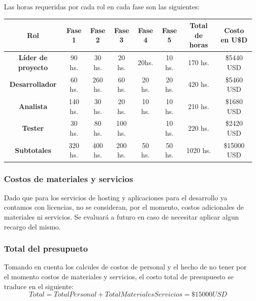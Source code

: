\documentclass[a4paper,12pt]{article}
\begin{document}
    \par Las horas requeridas por cada rol en cada fase son las siguientes: \newline
    \begin{center}
        \begin{adjustbox}{width=1\textwidth}
            \begin{tabular}{ |c|c|c|c|c|c|c|c| }
                \hline
                \rowcolor{lightgray} \textbf{Rol} & \textbf{Fase 1} & \textbf{Fase 2} & \textbf{Fase 3} & \textbf{Fase 4} & \textbf{Fase 5} & \textbf{Total de horas} & \textbf{Costo en U\$D} \\
                \hline    
                \cellcolor{lightgray} \textbf{Líder de proyecto} & 90 hs. & 30 hs. & 20 hs. & 20hs. & 10 hs. & \cellcolor{lightgray} 170 hs. & \cellcolor{lightgray} \$5440 USD \\
                \hline
                \cellcolor{lightgray} \textbf{Desarrollador} & 60 hs. & 260 hs. & 60 hs. & 20 hs. & 20 hs. & \cellcolor{lightgray} 420 hs. & \cellcolor{lightgray} \$5460 USD \\
                \hline
                \cellcolor{lightgray} \textbf{Analista} & 140 hs. & 30 hs. & 20 hs. & 10 hs. & 10 hs. & \cellcolor{lightgray} 210 hs. & \cellcolor{lightgray} \$1680 USD \\
                \hline
                \cellcolor{lightgray} \textbf{Tester} & 30 hs. & 80 hs. & 100 hs. &  & 10 hs. & \cellcolor{lightgray} 220 hs. & \cellcolor{lightgray} \$2420 USD \\
                \hline
                \rowcolor{lightgray} \textbf{Subtotales} & 320 hs. & 400 hs. & 200 hs. & 50 hs. & 50 hs. & 1020 hs. & \$15000 USD \\
                \hline
            \end{tabular}
        \end{adjustbox}
    \end{center}
    \subsubsection{Costos de materiales y servicios}
    \par Dado que para los servicios de hosting y aplicaciones para el desarrollo ya contamos con licencias, no se consideran, por el momento, costos adicionales de materiales ni servicios. Se evaluará a futuro en caso de necesitar aplicar algun recargo del mismo.
    \subsubsection{Total del presupueto}
    \par Tomando en cuenta los calcules de costos de personal y el hecho de no tener por el momento costos de materiales y servicios, el costo total de presupuesto se traduce en el siguiente:
    \[ Total = Total Personal + Total Materiales Servicios = \$15000 USD \]




    \newpage

    \printbibliography[heading=bibintoc]
\end{document}

